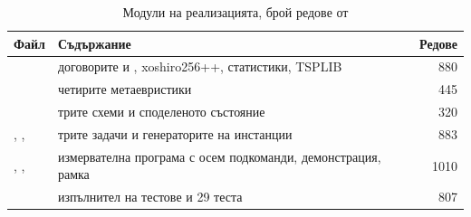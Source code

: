 \begin{table}[htbp]
\centering
\renewcommand{\arraystretch}{0.9}
\caption{Модули на реализацията, брой редове от }
\label{tab:files}
\begin{adjustbox}{max width=\textwidth}
\begin{tabular}{@{}L{3.4cm}L{9.0cm}r@{}}
\toprule
\textbf{Файл} & \textbf{Съдържание} & \textbf{Редове} \\
\midrule
{} & договорите  и , xoshiro256++, статистики, TSPLIB & 880 \\
 & четирите метаевристики & 445 \\
 & трите схеми и споделеното състояние & 320 \\
, ,  & трите задачи и генераторите на инстанции & 883 \\
, ,  & измервателна програма с осем подкоманди, демонстрация, рамка & 1010 \\
 & изпълнител на тестове и 29 теста & 807 \\
\bottomrule
\end{tabular}
\end{adjustbox}
\end{table}
